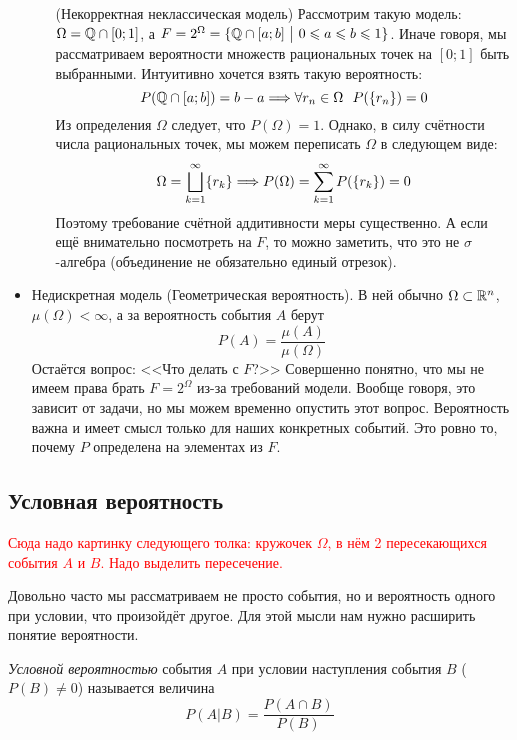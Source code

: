 \begin{itemize}
\begin{enumerate}
		\begin{example} (Некорректная неклассическая модель)
			Рассмотрим такую модель: $\Omega = \mathbb{Q} \cap [0; 1]$, а $F = 2^\Omega = \{\mathbb{Q} \cap [a; b] \ \big|\  0 \leqslant a \leqslant b \leqslant 1\}$. Иначе говоря, мы рассматриваем вероятности множеств рациональных точек на $[0; 1]$ быть выбранными. Интуитивно хочется взять такую вероятность:
			\[
				P(\mathbb{Q} \cap [a; b]) = b - a \Longrightarrow \forall r_n \in \Omega\ \ P(\{r_n\}) = 0
			\]
			Из определения $\Omega$ следует, что $P(\Omega) = 1$. Однако, в силу счётности числа рациональных точек, мы можем переписать $\Omega$ в следующем виде:
			\[
				\Omega = \bigsqcup_{k = 1}^\infty \{r_k\} \Longrightarrow P(\Omega) = \sum_{k = 1}^\infty P(\{r_k\}) = 0
			\]
			Поэтому требование счётной аддитивности меры существенно. А если ещё внимательно посмотреть на $F$, то можно заметить, что это не $\sigma$-алгебра (объединение не обязательно единый отрезок).
		\end{example}
	\end{enumerate}

	\item Недискретная модель (Геометрическая вероятность). В ней обычно $\Omega \subset \mathbb{R}^n$, $\mu(\Omega) < \infty$, а за вероятность события $A$ берут
	\[
		P(A) = \frac{\mu(A)}{\mu(\Omega)}
	\]
	Остаётся вопрос: <<Что делать с $F$?>> Совершенно понятно, что мы не имеем права брать $F = 2^\Omega$ из-за требований модели. Вообще говоря, это зависит от задачи, но мы можем временно опустить этот вопрос. Вероятность важна и имеет смысл только для наших конкретных событий. Это ровно то, почему $P$ определена на элементах из $F$.
\end{itemize}

\subsection{Условная вероятность}

\textcolor{red}{Сюда надо картинку следующего толка: кружочек $\Omega$, в нём 2 пересекающихся события $A$ и $B$. Надо выделить пересечение.}

\begin{note}
	Довольно часто мы рассматриваем не просто события, но и вероятность одного при условии, что произойдёт другое. Для этой мысли нам нужно расширить понятие вероятности.
\end{note}

\begin{definition}
	\textit{Условной вероятностью} события $A$ при условии наступления события $B$ ($P(B) \neq 0$) называется величина
	\[
		P(A | B) = \frac{P(A \cap B)}{P(B)}
	\]
\end{definition}


